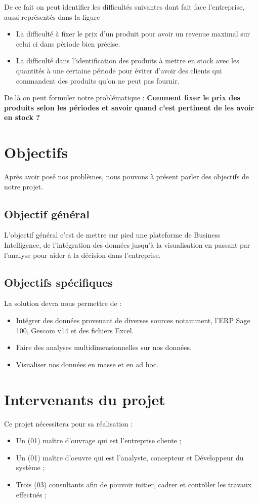 De ce fait on peut identifier les difficultés  suivantes dont fait face l'entreprise, aussi représentés dans la figure 
\begin{itemize}
    \item La difficulté à fixer le prix d'un produit pour avoir un revenue maximal sur celui ci dans période bien précise.
    \item La difficulté dans l'identification des produits à mettre en stock avec les quantités à une certaine période pour éviter d'avoir des clients qui commandent des produits qu'on ne peut pas fournir.
\end{itemize}
De là on peut formuler notre problématique : \textbf{Comment fixer le prix des produits selon les périodes et savoir quand c’est pertinent de les avoir en stock ?}  



\section{Objectifs}
Après avoir posé nos problèmes, nous pouvons à présent parler des objectifs de notre projet.

\subsection{Objectif général}
L’objectif général c’est de mettre sur pied une plateforme de Business Intelligence, de l’intégration des données jusqu’à la visualisation en passant par l’analyse pour aider à la décision dans l'entreprise. 

\subsection{Objectifs spécifiques}
La solution devra nous permettre de :
\begin{itemize}
    \item Intégrer des données provenant de diverses sources notamment, l’ERP Sage 100, Gescom v14 et des fichiers Excel.
    \item Faire des analyses multidimensionnelles sur nos données.
    \item Visualiser nos données en masse et en ad hoc.
\end{itemize}


\section{Intervenants du projet}
Ce projet nécessitera pour sa réalisation :
\begin{itemize}
    \item Un (01) maître d'ouvrage qui est l'entreprise cliente ;
    \item Un (01) maître d'oeuvre qui est l'analyste, concepteur et Développeur du système ;
    \item Trois (03) consultants afin de pouvoir initier, cadrer et contrôler les travaux effectués ;    
\end{itemize}

